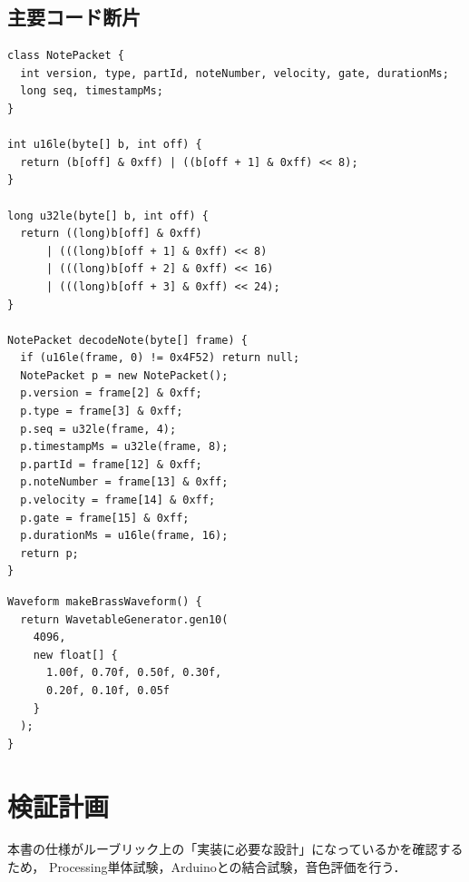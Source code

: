 \documentclass[a4paper,11pt]{jsarticle}
\begin{document}
\subsection{主要コード断片}

\begin{lstlisting}[style=code, caption={NOTE復号の最小実装イメージ}]
class NotePacket {
  int version, type, partId, noteNumber, velocity, gate, durationMs;
  long seq, timestampMs;
}

int u16le(byte[] b, int off) {
  return (b[off] & 0xff) | ((b[off + 1] & 0xff) << 8);
}

long u32le(byte[] b, int off) {
  return ((long)b[off] & 0xff)
      | (((long)b[off + 1] & 0xff) << 8)
      | (((long)b[off + 2] & 0xff) << 16)
      | (((long)b[off + 3] & 0xff) << 24);
}

NotePacket decodeNote(byte[] frame) {
  if (u16le(frame, 0) != 0x4F52) return null;
  NotePacket p = new NotePacket();
  p.version = frame[2] & 0xff;
  p.type = frame[3] & 0xff;
  p.seq = u32le(frame, 4);
  p.timestampMs = u32le(frame, 8);
  p.partId = frame[12] & 0xff;
  p.noteNumber = frame[13] & 0xff;
  p.velocity = frame[14] & 0xff;
  p.gate = frame[15] & 0xff;
  p.durationMs = u16le(frame, 16);
  return p;
}
\end{lstlisting}

\begin{lstlisting}[style=code, caption={金管波形生成の実装イメージ}]
Waveform makeBrassWaveform() {
  return WavetableGenerator.gen10(
    4096,
    new float[] {
      1.00f, 0.70f, 0.50f, 0.30f,
      0.20f, 0.10f, 0.05f
    }
  );
}
\end{lstlisting}

\newpage
\section{検証計画}

本書の仕様がルーブリック上の「実装に必要な設計」になっているかを確認するため，
Processing単体試験，Arduinoとの結合試験，音色評価を行う．
\end{document}
